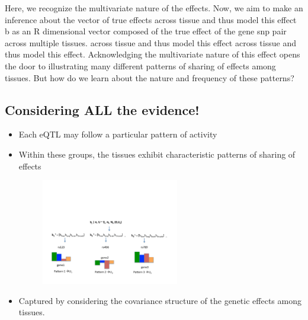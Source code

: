 \documentclass[10pt,letterpaper]{article}
\begin{document}
Here, we recognize the multivariate nature of the effects. Now, we aim to make an inference about the vector of  true effects across tissue and thus model this effect b as an R dimensional vector composed of the true effect of the gene snp pair across multiple tissues. across tissue and thus model this effect across tissue and thus model this effect. Acknowledging the multivariate nature of this effect opens the door to illustrating many different patterns of sharing of effects among tissues. But how do we learn about the nature and frequency of these patterns?

\subsection{Considering ALL the evidence!}
\begin{itemize}
\item Each eQTL may follow a particular pattern of activity %
\item Within these groups, the tissues exhibit characteristic patterns of sharing of effects %
 \begin{figure}
\includegraphics[width=6cm]{hm.pdf}
\end{figure}
\item Captured by considering the covariance structure of the genetic effects among tissues. 

\end{itemize}
\end{document}
